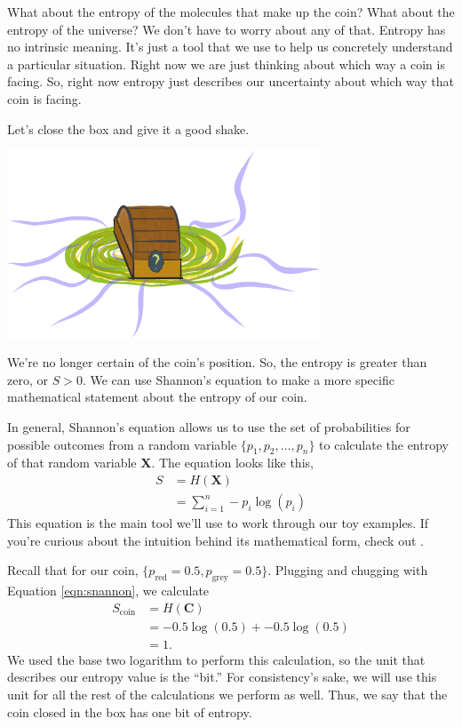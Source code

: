 What about the entropy of the molecules that make up the coin?
What about the entropy of the universe?
We don't have to worry about any of that.
Entropy has no intrinsic meaning.
It's just a tool that we use to help us concretely understand a particular situation.
Right now we are just thinking about which way a coin is facing.
So, right now entropy just describes our uncertainty about which way that coin is facing.

Let's close the box and give it a good shake.
\begin{center}
\includegraphics[width=0.7\textwidth]{img/big-box-closed-portal}
\end{center}
We're no longer certain of the coin's position.
So, the entropy is greater than zero, or $S > 0$.
We can use Shannon's equation to make a more specific mathematical statement about the entropy of our coin.

In general, Shannon's equation allows us to use the set of probabilities for possible outcomes from a random variable $\{p_1, p_2, \ldots, p_n\}$ to calculate the entropy of that random variable $\bm{X}$.
The equation looks like this,
\begin{align} \label{eqn:shannon}
S
&= H(\bm{X}) \\
&= \sum_{i=1}^{n} -p_i \log(p_i)
\end{align}
This equation is the main tool we'll use to work through our toy examples.
If you're curious about the intuition behind its mathematical form, check out \cite{Adami2016}.

Recall that for our coin, $\{p_{\text{red}} = 0.5, p_{\text{grey}} = 0.5 \}$.
Plugging and chugging with Equation \ref{eqn:snannon}, we calculate
\begin{align*}
S_{\text{coin}}
&= H(\bm{C}) \\
&= -0.5 \log(0.5) + -0.5 \log(0.5) \\
&= 1.
\end{align*}
We used the base two logarithm to perform this calculation, so the unit that describes our entropy value is the ``bit.''
For consistency's sake, we will use this unit for all the rest of the calculations we perform as well.
Thus, we say that the coin closed in the box has one bit of entropy.

